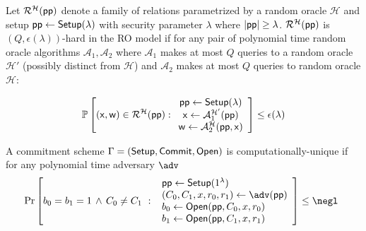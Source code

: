\begin{definition} Let $\mathcal{R}^\mathcal{H}(\textsf{pp})$ denote a family of relations parametrized by a random oracle $\mathcal{H}$ and setup $\textsf{pp} \gets \textsf{{Setup}}(\lambda)$ with security parameter $\lambda$ where $|\textsf{pp}| \geq \lambda$. $\mathcal{R}^\mathcal{H}(\textsf{pp})$ is $(Q, \epsilon(\lambda))$-hard in the RO model if for any pair of polynomial time random oracle algorithms $\mathcal{A}_1, \mathcal{A}_2$ where $\mathcal{A}_1$ makes at most $Q$ queries to a random oracle $\mathcal{H}'$ (possibly distinct from $\mathcal{H}$) and $\mathcal{A}_2$ makes at most $Q$ queries to random oracle $\mathcal{H}$: 

$$\mathbb{P}\left[(\mathsf{x}, \mathsf{w}) \in \mathcal{R}^\mathcal{H}(\textsf{pp}): \begin{array}{c} \textsf{pp} \gets \textsf{{Setup}}(\lambda) \\ \mathsf{x} \gets \mathcal{A}_1^{\mathcal{H}'}(\textsf{pp}) \\ \mathsf{w} \gets \mathcal{A}_2^{\mathcal{H}}(\textsf{pp}, \mathsf{x}) \end{array} \right] \leq \epsilon(\lambda)$$

	
\end{definition}
\begin{definition}\label{def:uniqueness} 
	A commitment scheme 
	$\Gamma=(\textsf{{Setup}},\textsf{{Commit}},\textsf{{Open}})$ is computationally-unique if for any polynomial time adversary $\adv$
\[
    \Pr\left[
        b_0 = b_1 =1 \, \wedge \, C_0 \neq C_1 \ : \
        \begin{array}{l}
             \params \gets \pro{Setup}(1^\lambda) \\
             (C_0,C_1, x, r_0, r_1) \gets \adv(\params) \\
             b_0 \gets \pro{Open}(\params, C_0, x, r_0) \\
             b_1 \gets \pro{Open}(\params, C_1, x, r_1) \\
        \end{array}
    \right] \leq \negl \enspace 
\]	 
\end{definition}


